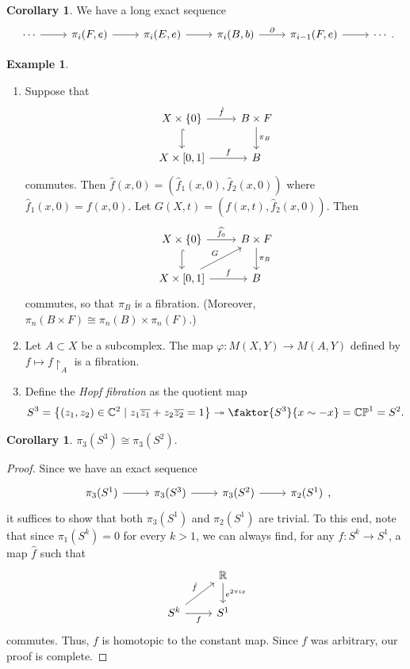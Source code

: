 \documentclass[10pt,letterpaper,cm]{nupset}
\theoremstyle{definition}
\newtheorem{exmp}[defn]{Example}
\theoremstyle{theorem}
\newtheorem{corollary}[defn]{Corollary}
\theoremstyle{remark}
\newcommand{\C}{\mathbb C}
\newcommand{\CP}{\mathbb{CP}}
\newcommand{\R}{\mathbb{R}}
\newcommand{\1}{\mathbb{1}}
\newcommand{\0}{\vec 0}
\newcommand{\be}{\begin{enumerate}}
\newcommand{\ee}{\end{enumerate}}
\begin{document}
\begin{corollary}\label{exhtpy}
We have a long exact sequence 
\[
\begin{tikzcd}
\cdots \arrow[r] & {\pi_i(F, e)} \arrow[r] & {\pi_i(E, e)} \arrow[r] & {\pi_i(B, b)} \arrow[r, "\partial"] & {\pi_{i-1}(F, e)} \arrow[r] & \cdots
\end{tikzcd}
.\]
\end{corollary}

\begin{exmp} $ $
\be
\item Suppose that
\[
\begin{tikzcd}
X\times \left\{0\right\} \arrow[d, hook] \arrow[r, "\hat{f}"] & B \times F \arrow[d, "\pi_B"] \\
{X\times \left[0,1\right]} \arrow[r, "f"]                           & B                            
\end{tikzcd}
\] commutes. Then $\hat{f}(x,0) = \left(\hat{f}_1(x,0), \hat{f}_2(x,0)\right)$ where $\hat{f}_1(x,0) = f(x,0)$. Let $G(X,t) =  \left(f(x,t), \hat{f}_2(x,0)\right)$. Then \[
\begin{tikzcd}
X\times \left\{0\right\} \arrow[d, hook] \arrow[r, "\widehat{f_0}"] & B \times F \arrow[d, "\pi_B"] \\
{X\times \left[0,1\right]} \arrow[r, "f"] \arrow[ru, "G"]           & B                            
\end{tikzcd}
\] commutes, so that $\pi_B$ is a fibration. (Moreover, $\pi_n(B \times F) \cong \pi_n(B) \times \pi_n(F)$.)
\item Let $A \subset X$ be a subcomplex. The map $\varphi : M(X, Y) \to M(A, Y)$ defined by $f \mapsto f\restriction_A$ is a fibration. 
\item Define the \textit{Hopf fibration} as the quotient map
\[
S^3 = \left\{\left(z_1, z_2\right) \in \C^2 \mid z_1\overline{z_1} + z_2\overline{z_2} =1\right\} \twoheadrightarrow \faktor{S^3}{x \sim {-}x} = \CP^1 =S^2.
\]
\ee
\end{exmp}

\pagebreak

\begin{corollary}
$\pi_3(S^3) \cong \pi_3(S^2)$.
\end{corollary}
\begin{proof}
Since we have an exact sequence 
\[
\begin{tikzcd}
\pi_3(S^1) \arrow[r] & \pi_3(S^3) \arrow[r] & \pi_3(S^2) \arrow[r] & \pi_2(S^1)
\end{tikzcd},
\] it suffices to show that both $\pi_3(S^1)$ and $\pi_2(S^1)$ are trivial. To this end, note that since $\pi_1(S^k) =0$ for every $k>1$, we can always find,  for any $f: S^k \to S^1$,  a map $\hat{f}$ such that
\[
\begin{tikzcd}
                                                  & \R \arrow[d, "e^{2\pi i x}"] \\
S^k \arrow[r, "f"'] \arrow[ru, "\hat{f}"] & S^1                         
\end{tikzcd}
\] commutes. Thus, $f$ is homotopic to the constant map. Since $f$ was arbitrary, our proof is complete.
\end{proof}
\end{document}
